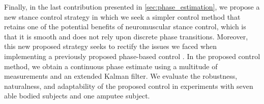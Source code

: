 Finally, in the last contribution presented in \cref{sec:phase_estimation}, we
propose a new stance control strategy in which we seek a simpler control method
that retains one of the potential benefits of neuromuscular stance control,
which is that it is smooth and does not rely upon discrete phase transitions.
Moreover, this new proposed strategy seeks to rectify the issues we faced when
implementing a previously proposed phase-based control
\citep{quintero2016preliminary}. In the proposed control method, we obtain a
continuous phase estimate using a multitude of measurements and an extended
Kalman filter. We evaluate the robustness, naturalness, and adaptability of the
proposed control in experiments with seven able bodied subjects and one amputee
subject.
